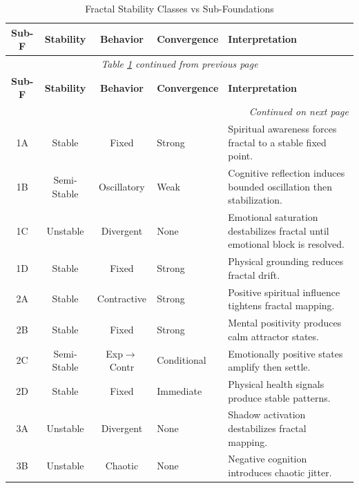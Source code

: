 \renewcommand{\arraystretch}{1.3}
\small
\begin{longtable}{c|c|c|p{2cm}|p{5cm}}
\caption{Fractal Stability Classes vs Sub-Foundations}
\label{tab:fractal-stability-subfoundation} \\
\toprule
\textbf{Sub-F}
& \textbf{Stability}
& \textbf{Behavior}
& \textbf{Convergence}
& \textbf{Interpretation}
\\
\midrule
\endfirsthead
\multicolumn{5}{c}{\textit{Table \ref{tab:fractal-stability-subfoundation} continued from previous page}} \\
\toprule
\textbf{Sub-F}
& \textbf{Stability}
& \textbf{Behavior}
& \textbf{Convergence}
& \textbf{Interpretation}
\\
\midrule
\endhead
\midrule
\multicolumn{5}{r}{\textit{Continued on next page}} \\
\endfoot
\bottomrule
\endlastfoot

1A & Stable & Fixed & Strong &
Spiritual awareness forces fractal to a stable fixed point. \\

1B & Semi-Stable & Oscillatory & Weak &
Cognitive reflection induces bounded oscillation then stabilization. \\

1C & Unstable & Divergent & None &
Emotional saturation destabilizes fractal until emotional block is resolved. \\

1D & Stable & Fixed & Strong &
Physical grounding reduces fractal drift. \\
\midrule

2A & Stable & Contractive & Strong &
Positive spiritual influence tightens fractal mapping. \\

2B & Stable & Fixed & Strong &
Mental positivity produces calm attractor states. \\

2C & Semi-Stable & Exp$\to$Contr & Conditional &
Emotionally positive states amplify then settle. \\

2D & Stable & Fixed & Immediate &
Physical health signals produce stable patterns. \\
\midrule

3A & Unstable & Divergent & None &
Shadow activation destabilizes fractal mapping. \\

3B & Unstable & Chaotic & None &
Negative cognition introduces chaotic jitter. \\


\end{longtable}
